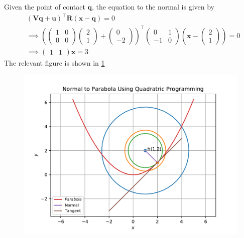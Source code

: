 \documentclass[12pt]{article}
\providecommand{\brak}[1]{\ensuremath{\left(#1\right)}}
\newcommand{\myvec}[1]{\ensuremath{\begin{pmatrix}#1\end{pmatrix}}}
\let\vec\mathbf
\begin{document}
Given the point of contact $\vec{q}$, the equation to the normal is given by
\begin{align}
	&\brak{\vec{V}\vec{q}+\vec{u}}^\top\vec{R}\brak{\vec{x}-\vec{q}} = 0 \\
	&\implies \brak{\myvec{1&0\\0&0}\myvec{2\\1}+\myvec{0 \\ -2}}^\top \myvec{0&1 \\-1&0}\brak{\vec{x}-\myvec{2\\1}} =0\\
	&\implies \myvec{1&1}\vec{x} = 3 
\end{align}
The relevant figure is shown in \ref{fig:12/6/6/23/lagmul/Fig1}
\begin{figure}[!h]
	\begin{center}
		\includegraphics[width=\columnwidth]{12/6/6/23/lagmul/figs/problem23.pdf}
	\end{center}
\caption{}
\label{fig:12/6/6/23/lagmul/Fig1}
\end{figure}
\end{document}

